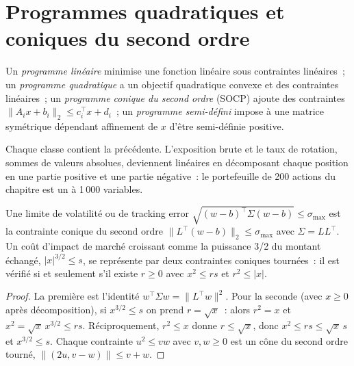 \section{Programmes quadratiques et coniques du second ordre}

\begin{definition}\label{def:qm:convex-optimisation:classes}
Un \emph{programme linéaire} minimise une fonction linéaire sous contraintes linéaires~; un \emph{programme quadratique} a un objectif quadratique convexe
et des contraintes linéaires~; un \emph{programme conique du second ordre} (SOCP) ajoute des contraintes $\lVert A_ix + b_i\rVert_2 \le c_i^\top x + d_i$~; un
\emph{programme semi-défini} impose à une matrice symétrique dépendant affinement de $x$ d'être semi-définie positive.
\end{definition}

Chaque classe contient la précédente. L'exposition brute et le taux de rotation, sommes de valeurs absolues, deviennent linéaires en décomposant chaque position en une partie positive et une partie négative~: le
portefeuille de 200 actions du chapitre est un  à 1\,000 variables.

\begin{proposition}\label{prop:qm:convex-optimisation:cones}
Une limite de volatilité ou de tracking error $\sqrt{(w - b)^\top\Sigma(w - b)} \le \sigma_{\max}$ est la contrainte conique du second ordre $\lVert L^\top(w - b)\rVert_2 \le \sigma_{\max}$ avec $\Sigma =
LL^\top$. Un coût d'impact de marché croissant comme la puissance 3/2 du montant échangé, $|x|^{3/2} \le s$, se représente par deux contraintes coniques tournées~: il est vérifié si et seulement s'il existe
$r \ge 0$ avec $x^2 \le rs$ et $r^2 \le |x|$.
\end{proposition}

\begin{proof}
La première est l'identité $w^\top\Sigma w = \lVert L^\top w\rVert^2$. Pour la seconde (avec $x \ge 0$ après décomposition), si $x^{3/2} \le s$ on prend $r = \sqrt x$~: alors $r^2 = x$ et $x^2 = \sqrt x\,x^{3/2} \le rs$.
Réciproquement, $r^2 \le x$ donne $r \le \sqrt x$, donc $x^2 \le rs \le \sqrt x\,s$ et $x^{3/2} \le s$. Chaque contrainte $u^2 \le vw$ avec $v, w \ge 0$ est un cône du second ordre tourné,
$\lVert(2u, v - w)\rVert \le v + w$.
\end{proof}

